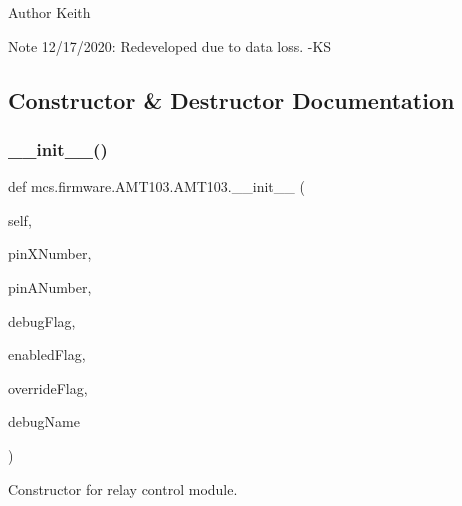 \begin{DoxyAuthor}{Author}
Keith 
\end{DoxyAuthor}
\begin{DoxyNote}{Note}
12/17/2020\+: Redeveloped due to data loss. -\/\+KS 
\end{DoxyNote}


\subsection{Constructor \& Destructor Documentation}
\mbox{\label{classmcs_1_1firmware_1_1AMT103_1_1AMT103_a11608d8fb67ad83c74feb8f81aa84391}} 
\subsubsection{\texorpdfstring{\+\_\+\+\_\+init\+\_\+\+\_\+()}{\_\_init\_\_()}}
{\footnotesize\ttfamily def mcs.\+firmware.\+A\+M\+T103.\+A\+M\+T103.\+\_\+\+\_\+init\+\_\+\+\_\+ (\begin{DoxyParamCaption}\item[{}]{self,  }\item[{}]{pin\+X\+Number,  }\item[{}]{pin\+A\+Number,  }\item[{}]{debug\+Flag,  }\item[{}]{enabled\+Flag,  }\item[{}]{override\+Flag,  }\item[{}]{debug\+Name }\end{DoxyParamCaption})}



Constructor for relay control module. 


